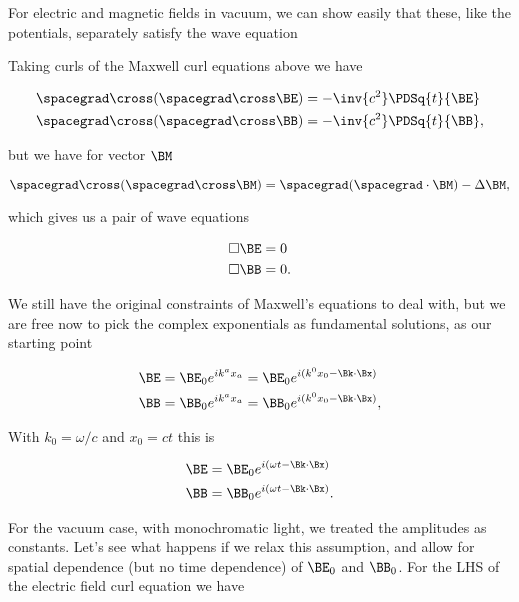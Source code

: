 For electric and magnetic fields in vacuum, we can show easily that these, like the potentials, separately satisfy the wave equation

Taking curls of the Maxwell curl equations above we have

\begin{align}\label{eqn:relativisticElectrodynamicsT4:30}
\spacegrad \cross (\spacegrad \cross \BE) &= - \inv{c^2} \PDSq{t}{\BE} \\
\spacegrad \cross (\spacegrad \cross \BB) &= - \inv{c^2} \PDSq{t}{\BB},
\end{align}

but we have for vector $\BM$

\begin{equation}\label{eqn:relativisticElectrodynamicsT4:50}
\spacegrad \cross (\spacegrad \cross \BM)
=
\spacegrad (\spacegrad \cdot \BM) - \Delta \BM,
\end{equation}

which gives us a pair of wave equations

\begin{align}\label{eqn:relativisticElectrodynamicsT4:70}
\square \BE &= 0 \\
\square \BB &= 0.
\end{align}

We still have the original constraints of Maxwell's equations to deal with, but we are free now to pick the complex exponentials as fundamental solutions, as our starting point

\begin{align}\label{eqn:relativisticElectrodynamicsT4:90}
\BE &= \BE_0 e^{i k^a x_a} = \BE_0 e^{ i (k^0 x_0 - \Bk \cdot \Bx) } \\
\BB &= \BB_0 e^{i k^a x_a} = \BB_0 e^{ i (k^0 x_0 - \Bk \cdot \Bx) },
\end{align}

With $k_0 = \omega/c$ and $x_0 = c t$ this is

\begin{align}\label{eqn:relativisticElectrodynamicsT4:110}
\BE &= \BE_0 e^{ i (\omega t - \Bk \cdot \Bx) } \\
\BB &= \BB_0 e^{ i (\omega t - \Bk \cdot \Bx) }.
\end{align}

For the vacuum case, with monochromatic light, we treated the amplitudes as constants.  Let's see what happens if we relax this assumption, and allow for spatial dependence (but no time dependence) of $\BE_0$ and $\BB_0$.  For the LHS of the electric field curl equation we have

